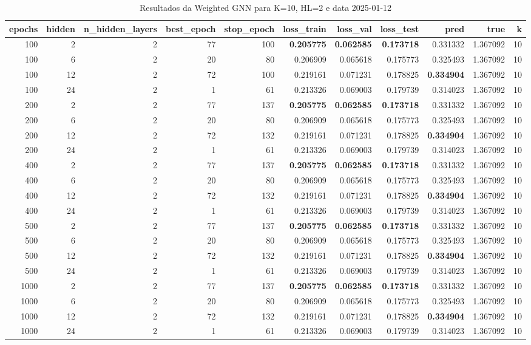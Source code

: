 \begin{table}
\caption{Resultados da Weighted GNN para K=10, HL=2 e data 2025-01-12}
\label{tab:weighted_gnn_results_k10_hl2_d20250112}
\begin{tabular}{rrrrrrrrrrr}
\toprule
epochs & hidden & n\_hidden\_layers & best\_epoch & stop\_epoch & loss\_train & loss\_val & loss\_test & pred & true & k \\
\midrule
100 & 2 & 2 & 77 & 100 & \textbf{0.205775} & \textbf{0.062585} & \textbf{0.173718} & 0.331332 & 1.367092 & 10 \\
100 & 6 & 2 & 20 & 80 & 0.206909 & 0.065618 & 0.175773 & 0.325493 & 1.367092 & 10 \\
100 & 12 & 2 & 72 & 100 & 0.219161 & 0.071231 & 0.178825 & \textbf{0.334904} & 1.367092 & 10 \\
100 & 24 & 2 & 1 & 61 & 0.213326 & 0.069003 & 0.179739 & 0.314023 & 1.367092 & 10 \\
200 & 2 & 2 & 77 & 137 & \textbf{0.205775} & \textbf{0.062585} & \textbf{0.173718} & 0.331332 & 1.367092 & 10 \\
200 & 6 & 2 & 20 & 80 & 0.206909 & 0.065618 & 0.175773 & 0.325493 & 1.367092 & 10 \\
200 & 12 & 2 & 72 & 132 & 0.219161 & 0.071231 & 0.178825 & \textbf{0.334904} & 1.367092 & 10 \\
200 & 24 & 2 & 1 & 61 & 0.213326 & 0.069003 & 0.179739 & 0.314023 & 1.367092 & 10 \\
400 & 2 & 2 & 77 & 137 & \textbf{0.205775} & \textbf{0.062585} & \textbf{0.173718} & 0.331332 & 1.367092 & 10 \\
400 & 6 & 2 & 20 & 80 & 0.206909 & 0.065618 & 0.175773 & 0.325493 & 1.367092 & 10 \\
400 & 12 & 2 & 72 & 132 & 0.219161 & 0.071231 & 0.178825 & \textbf{0.334904} & 1.367092 & 10 \\
400 & 24 & 2 & 1 & 61 & 0.213326 & 0.069003 & 0.179739 & 0.314023 & 1.367092 & 10 \\
500 & 2 & 2 & 77 & 137 & \textbf{0.205775} & \textbf{0.062585} & \textbf{0.173718} & 0.331332 & 1.367092 & 10 \\
500 & 6 & 2 & 20 & 80 & 0.206909 & 0.065618 & 0.175773 & 0.325493 & 1.367092 & 10 \\
500 & 12 & 2 & 72 & 132 & 0.219161 & 0.071231 & 0.178825 & \textbf{0.334904} & 1.367092 & 10 \\
500 & 24 & 2 & 1 & 61 & 0.213326 & 0.069003 & 0.179739 & 0.314023 & 1.367092 & 10 \\
1000 & 2 & 2 & 77 & 137 & \textbf{0.205775} & \textbf{0.062585} & \textbf{0.173718} & 0.331332 & 1.367092 & 10 \\
1000 & 6 & 2 & 20 & 80 & 0.206909 & 0.065618 & 0.175773 & 0.325493 & 1.367092 & 10 \\
1000 & 12 & 2 & 72 & 132 & 0.219161 & 0.071231 & 0.178825 & \textbf{0.334904} & 1.367092 & 10 \\
1000 & 24 & 2 & 1 & 61 & 0.213326 & 0.069003 & 0.179739 & 0.314023 & 1.367092 & 10 \\
\bottomrule
\end{tabular}
\end{table}

